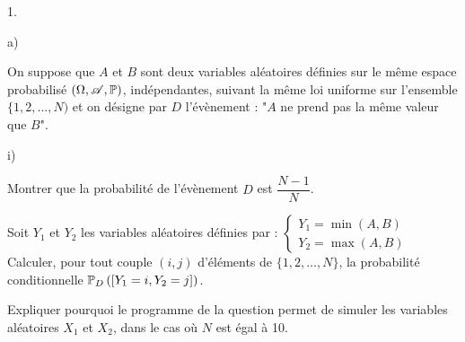 \documentclass[11pt]{article}%
\begin{document}
\begin{noliste}{1.}
\begin{noliste}{a)}
\item On suppose que $A$ et $B$ sont deux variables aléatoires définies
sur
le même espace probabilisé $(\Omega,\mathscr{A},\mathbb{P})$, indépendantes, suivant 
la
même
loi uniforme sur l'ensemble $\{1,2,\ldots,N)$ et on désigne par $D$
l'évènement : "$A$ ne prend pas la même valeur que $B$".

\begin{nonoliste}{i)}
\item Montrer que la probabilité de l'évènement $D$ est
$\dfrac{N-1}{N}$.

\item Soit $Y_{1}$ et $Y_{2}$ les variables aléatoires définies par :
$\left\{ 
\begin{array}{l}
Y_{1} = \min (A,B) \\
Y_{2} = \max (A,B)
\end{array}
\right. $\\[.2cm]
Calculer, pour tout couple $(i,j)$ d'éléments de $\{1,2,\ldots,N\}$, la
probabilité conditionnelle $\mathbb{P}_D\left(\left[ {Y_{1} = i,Y_{2} = 
j} \right]\right)$.
\end{nonoliste}

\item Expliquer pourquoi le programme de la question  permet 
de
simuler les
variables aléatoires $X_{1}$ et $X_{2}$, dans le cas où
$N$
est égal à 10.
\end{noliste}
\end{noliste}
\end{document}
